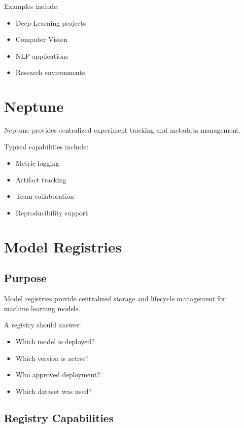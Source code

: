 Examples include:

\begin{itemize}
    \item Deep Learning projects
    \item Computer Vision
    \item NLP applications
    \item Research environments
\end{itemize}

\section{Neptune}

Neptune provides centralized experiment tracking and metadata management.

Typical capabilities include:

\begin{itemize}
    \item Metric logging
    \item Artifact tracking
    \item Team collaboration
    \item Reproducibility support
\end{itemize}

\section{Model Registries}

\subsection{Purpose}

Model registries provide centralized storage and lifecycle management for machine learning models.

A registry should answer:

\begin{itemize}
    \item Which model is deployed?
    \item Which version is active?
    \item Who approved deployment?
    \item Which dataset was used?
\end{itemize}

\subsection{Registry Capabilities}

